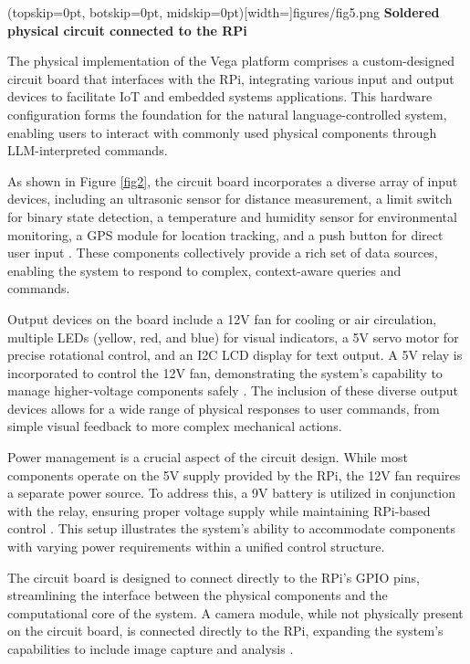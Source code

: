 \documentclass{ieeeaccess}
\begin{document}
\Figure[t!](topskip=0pt, botskip=0pt,
midskip=0pt)[width=\textwidth]{{figures/fig5.png}}
{ \textbf{Soldered physical circuit connected to the RPi }\label{fig2}}

The physical implementation of the Vega platform comprises a custom-designed circuit board that interfaces with the RPi, integrating various input and output devices to facilitate IoT and embedded systems applications. This hardware configuration forms the foundation for the natural language-controlled system, enabling users to interact with commonly used physical components  through LLM-interpreted commands.

As shown in Figure \ref{fig2}, the circuit board incorporates a diverse array of input devices, including an ultrasonic sensor for distance measurement, a limit switch for binary state detection, a temperature and humidity sensor for environmental monitoring, a GPS module for location tracking, and a push button for direct user input \cite{electronicwings_sensors_modules}. These components collectively provide a rich set of data sources, enabling the system to respond to complex, context-aware queries and commands.

Output devices on the board include a 12V fan for cooling or air circulation, multiple LEDs (yellow, red, and blue) for visual indicators, a 5V servo motor for precise rotational control, and an I2C LCD display for text output. A 5V relay is incorporated to control the 12V fan, demonstrating the system's capability to manage higher-voltage components safely \cite{smith2020}. The inclusion of these diverse output devices allows for a wide range of physical responses to user commands, from simple visual feedback to more complex mechanical actions.

Power management is a crucial aspect of the circuit design. While most components operate on the 5V supply provided by the RPi, the 12V fan requires a separate power source. To address this, a 9V battery is utilized in conjunction with the relay, ensuring proper voltage supply while maintaining RPi-based control \cite{monk2019}. This setup illustrates the system's ability to accommodate components with varying power requirements within a unified control structure.

The circuit board is designed to connect directly to the RPi's GPIO pins, streamlining the interface between the physical components and the computational core of the system. A camera module, while not physically present on the circuit board, is connected directly to the RPi, expanding the system's capabilities to include image capture and analysis \cite{pi_camera_2018}.
\end{document}
